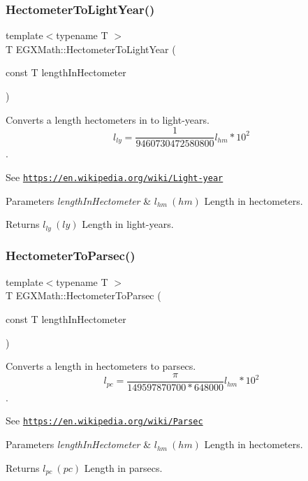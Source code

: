 \subsubsection{\texorpdfstring{Hectometer\+To\+Light\+Year()}{HectometerToLightYear()}}
{\footnotesize\ttfamily template$<$typename T $>$ \\
T E\+G\+X\+Math\+::\+Hectometer\+To\+Light\+Year (\begin{DoxyParamCaption}\item[{const T}]{length\+In\+Hectometer }\end{DoxyParamCaption})}



Converts a length hectometers in to light-\/years. \[ l_{ly}= \frac{1}{9460730472580800} l_{hm} * 10^{2} \]. 

See \href{https://en.wikipedia.org/wiki/Light-year}{\tt https\+://en.\+wikipedia.\+org/wiki/\+Light-\/year} 
\begin{DoxyParams}{Parameters}
{\em length\+In\+Hectometer} & $ l_{hm}\ (hm)$ Length in hectometers. \\
\hline
\end{DoxyParams}
\begin{DoxyReturn}{Returns}
$ l_{ly}\ (ly)$ Length in light-\/years. 
\end{DoxyReturn}
\mbox{\label{group___e_g_x_math-_conversions-_length_conversions-_hectometer-_astronomical_gae327abefa3e19b130dfde5d8e1f4a4ab}} 
\subsubsection{\texorpdfstring{Hectometer\+To\+Parsec()}{HectometerToParsec()}}
{\footnotesize\ttfamily template$<$typename T $>$ \\
T E\+G\+X\+Math\+::\+Hectometer\+To\+Parsec (\begin{DoxyParamCaption}\item[{const T}]{length\+In\+Hectometer }\end{DoxyParamCaption})}



Converts a length in hectometers to parsecs. \[ l_{pc}=\frac{\pi}{149597870700 * 648000} l_{hm} * 10^{2} \]. 

See \href{https://en.wikipedia.org/wiki/Parsec}{\tt https\+://en.\+wikipedia.\+org/wiki/\+Parsec} 
\begin{DoxyParams}{Parameters}
{\em length\+In\+Hectometer} & $ l_{hm}\ (hm)$ Length in hectometers. \\
\hline
\end{DoxyParams}
\begin{DoxyReturn}{Returns}
$ l_{pc}\ (pc)$ Length in parsecs. 
\end{DoxyReturn}
